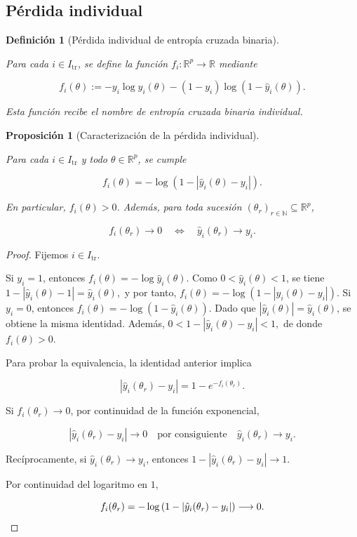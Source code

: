 \documentclass[a4paper,openany,oneside,10pt]{report}
\theoremstyle{pnlTeorema}
\newtheorem{proposicion}{Proposición}[section]
\theoremstyle{pnlDefinicion}
\newtheorem{definicion}{Definición}[section]
\theoremstyle{pnlObservacion}
\begin{document}
\subsection{Pérdida individual}

\begin{definicion}[Pérdida individual de entropía cruzada binaria]\label{def:perdida-individual}

Para cada $i\in I_{\mathrm{tr}}$, se define la función
$f_i:\mathbb{R}^p\to\mathbb{R}$ mediante

\[
\boxed{
f_i(\theta)
:=
-y_i\log \hat y_i(\theta)
-(1-y_i)\log(1-\hat y_i(\theta)).
}
\]

Esta función recibe el nombre de entropía cruzada binaria individual.

\end{definicion}

\begin{proposicion}[Caracterización de la pérdida individual]\label{prop:caracterizacion-perdida-individual}

Para cada $i\in I_{\mathrm{tr}}$ y todo $\theta\in\mathbb{R}^p$, se cumple

\[
f_i(\theta)
=
-\log\left(1-|\hat y_i(\theta)-y_i|\right).
\]

En particular, $f_i(\theta)>0$. Además, para toda sucesión
$(\theta_r)_{r\in\mathbb{N}}\subseteq\mathbb{R}^p$,

\[
f_i(\theta_r)\longrightarrow 0
\quad\Longleftrightarrow\quad
\hat y_i(\theta_r)\longrightarrow y_i.
\]

\end{proposicion}

\begin{proof}

Fijemos $i\in I_{\mathrm{tr}}$.

Si $y_i=1$, entonces $
f_i(\theta)=-\log \hat y_i(\theta).
$ Como $0<\hat y_i(\theta)<1$, se tiene $
1-|\hat y_i(\theta)-1|=\hat y_i(\theta),
$ y por tanto, $
f_i(\theta)
=
-\log\left(1-|\hat y_i(\theta)-y_i|\right).
$ Si $y_i=0$, entonces $
f_i(\theta)=-\log(1-\hat y_i(\theta)).
$ Dado que $|\hat y_i(\theta)|=\hat y_i(\theta)$, se obtiene la misma identidad. Además, $
0<1-|\hat y_i(\theta)-y_i|<1,
$ de donde $f_i(\theta)>0$.

Para probar la equivalencia, la identidad anterior implica

\[
|\hat y_i(\theta_r)-y_i|
=
1-e^{-f_i(\theta_r)}.
\]

Si $f_i(\theta_r)\to 0$, por continuidad de la función exponencial,

\[
|\hat y_i(\theta_r)-y_i|\longrightarrow 0 \quad \text{por consiguiente} \quad \hat y_i(\theta_r)\longrightarrow y_i.
\]

Recíprocamente, si $\hat y_i(\theta_r)\to y_i$, entonces $
1-|\hat y_i(\theta_r)-y_i|\longrightarrow 1.
$

Por continuidad del logaritmo en $1$,

\[
f_i(\theta_r)
=
-\log\left(1-|\hat y_i(\theta_r)-y_i|\right)
\longrightarrow 0.\qedhere
\]
\end{proof}
\end{document}

